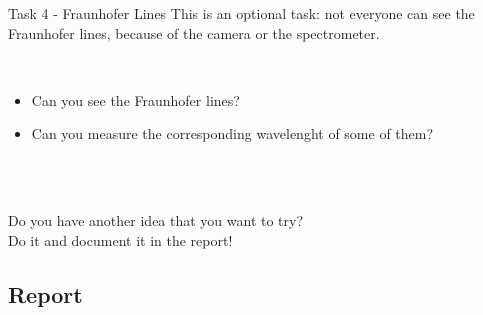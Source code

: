\documentclass[9pt, xcolor=dvipsnames]{beamer}
\begin{document}
\begin{frame}{Task 4 - Fraunhofer Lines}	
This is an optional task: not everyone can see the 	Fraunhofer lines, because of the camera or the spectrometer.

~\\

\begin{itemize}
	\item Can you see the Fraunhofer lines?
	\item Can you measure the corresponding wavelenght of some of them?
	
\end{itemize}

~\\
~\\

\centering

Do you have another idea that you want to try? \\
Do it and document it in the report!

\end{frame}


\subsection{Report }
\end{document}

